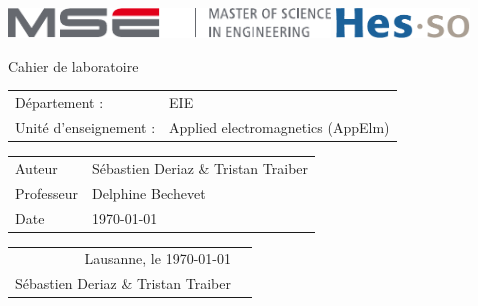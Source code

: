 \documentclass[]{article}
\newcommand{\Author}{Sébastien Deriaz \& Tristan Traiber}
\newcommand{\professor}{Delphine Bechevet}
\newcommand{\assistant}{}
\newcommand{\cours}{Applied electromagnetics (AppElm)}
\newcommand{\titre}{Cahier de laboratoire}
\begin{document}
\thispagestyle{empty}

\begin{center}
\includegraphics[height=8mm]{mse-full-cropped.pdf}
\hfill
\includegraphics[height=8mm]{HES-SO_logo_Pantone.pdf}
\end{center}
\vfill
\begin{center}
\Huge \titre\\
\end{center}
\begin{center}
\large
\begin{tabular}{ll}
Département : & EIE\\
Unité d'enseignement : & \cours
\end{tabular}
\end{center}
\vfill
\begin{center}
\large
\begin{tabular}{ll}
\Large Auteur & \Large \Author\\
Professeur & \professor\\ 
Date & \today
\end{tabular}
\end{center}
\vfill

\pagebreak
\tableofcontents
\pagebreak

\pagebreak

\pagebreak

\pagebreak

\pagebreak

\pagebreak


\begin{flushright}
\begin{tabular}{r m{3cm}}
Lausanne, le \today & \\
\Author & \\
\end{tabular}
\end{flushright}

\pagebreak
\end{document}
